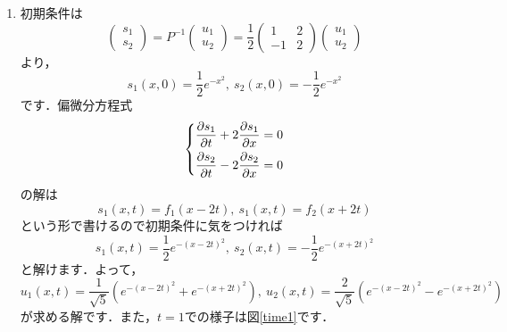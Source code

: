 \documentclass[a4paper,pdflatex,ja=standard]{bxjsarticle}
\begin{document}
\begin{enumerate}
\begin{enumerate}
    \item 

    初期条件は
    \begin{equation}
      \begin{pmatrix}
        s_1 \\
        s_2
      \end{pmatrix}
      =
      P^{-1}
      \begin{pmatrix}
        u_1 \\
        u_2
      \end{pmatrix}
      =
      \frac{1}{2}
      \begin{pmatrix}
        1 & 2 \\
        -1 & 2
      \end{pmatrix}
      \begin{pmatrix}
        u_1 \\
        u_2
      \end{pmatrix}
    \end{equation}
    より，
    \begin{equation}
      s_1(x,0)
      =
      \frac{1}{2}e^{-x^2}
      ,\ 
      s_2(x,0)
      =
      -
      \frac{1}{2}e^{-x^2}
    \end{equation}
    です．偏微分方程式
    \begin{equation}
      \left\{
        \begin{alignedat}{1}
          \pdv{s_1}{t}
          +
          2
          \pdv{s_1}{x}
          &=
          0
          \\
          \pdv{s_2}{t}
          -
          2
          \pdv{s_2}{x}
          &=
          0
        \end{alignedat}
      \right.
    \end{equation}
    の解は
    \begin{equation}
      s_1(x,t)
      =
      f_1(x-2t)
      ,\ 
      s_1(x,t)
      =
      f_2(x+2t)
    \end{equation}
    という形で書けるので初期条件に気をつければ
    \begin{equation}
      s_1(x,t)
      =
      \frac{1}{2}e^{-(x-2t)^2}
      ,\ 
      s_2(x,t)
      =
      -
      \frac{1}{2}e^{-(x+2t)^2}
    \end{equation}
    と解けます．よって，
    \begin{equation}
      u_1(x,t)
      =
      \frac{1}{\sqrt{5}}
      \left(  
        e^{-(x-2t)^2}+e^{-(x+2t)^2}
      \right)
      ,\ 
      u_2(x,t)
      =
      \frac{2}{\sqrt{5}}
      \left(  
        e^{-(x-2t)^2}-e^{-(x+2t)^2}
      \right)
    \end{equation}
    が求める解です．また，$t=1$での様子は図\ref{time1}です．


\end{enumerate}
\end{enumerate}
\end{document}
